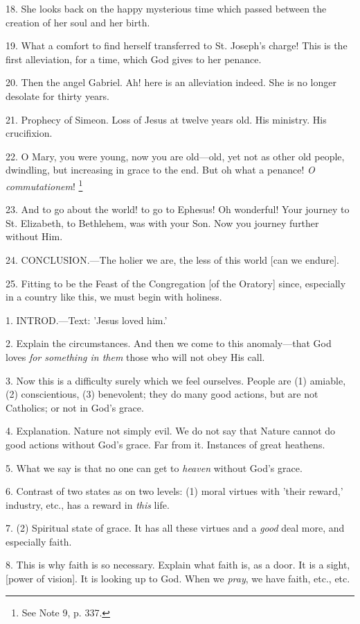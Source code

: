 18. She looks back on the happy mysterious time
which passed between the creation of her soul and her birth.

19. What a comfort to find herself transferred to
St. Joseph's charge! This is the first alleviation, for a time, which
God gives to her penance.

20. Then the angel Gabriel. Ah! here is an
alleviation indeed. She is no longer desolate for thirty years.

21. Prophecy of Simeon. Loss of Jesus at twelve
years old. His ministry. His crucifixion.

22. O Mary, you were young, now you are
old—old, yet not as other old people, dwindling, but increasing in
grace to the end. But oh what a penance! \emph{O commutationem}! \footnote{See Note
9, p. 337.}

23. And to go about the world! to go to Ephesus!
Oh wonderful! Your journey to St. Elizabeth, to Bethlehem, was with
your Son. Now you journey further without Him.

24. CONCLUSION.—The
holier we are, the less of this world [can we endure].

25. Fitting to be the Feast of the Congregation
[of the Oratory] since, especially in a country like this, we must
begin with holiness.


1. INTROD.—Text:
'Jesus loved him.'

2. Explain the circumstances. And then we come to
this anomaly—that God loves \emph{for something in them} those who
will not obey His call.

3. Now this is a difficulty surely which we feel
ourselves. People are (1) amiable, (2) conscientious, (3) benevolent;
they do many good actions, but are not Catholics; or not in God's
grace.

4. Explanation. Nature not simply evil. We do not
say that Nature cannot do good actions without God's grace. Far from
it. Instances of great heathens.

5. What we say is that no one can get to \emph{heaven}
without God's grace.

6. Contrast of two states as on two levels: (1)
moral virtues with 'their reward,' industry, etc., has a reward in \emph{this}
life.

7. (2) Spiritual state of grace. It has all these
virtues and a \emph{good} deal more, and especially faith.

8. This is why faith is so necessary. Explain
what faith is, as a door. It is a sight, [power of vision]. It is
looking up to God. When we \emph{pray}, we have faith, etc., etc.

